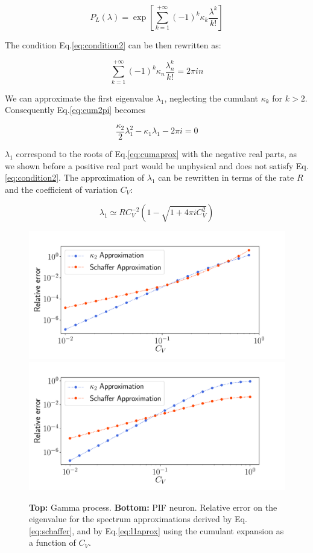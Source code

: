 \documentclass[12pt,twoside]{report}
\begin{document}
\begin{equation}
\label{eq:PLcum}
P_L(\lambda)=\exp\left[ \sum_{k=1}^{+\infty}(-1)^k\kappa_k \frac{\lambda^k}{k!}\right]
\end{equation}

The condition Eq.\eqref{eq:condition2} can be then rewritten as:

\begin{equation}
\label{eq:cum2pi}
\sum_{k=1}^{+\infty}(-1)^k\kappa_n \frac{\lambda_n^k}{k!}=2 \pi i n
\end{equation}

We can approximate the first eigenvalue $\lambda_1$, neglecting the cumulant $\kappa_k$ for $k>2$. Consequently  Eq.\eqref{eq:cum2pi} becomes

\begin{equation}
\label{eq:cumaprox}
\frac{\kappa_2}{2}\lambda_1^2-\kappa_1\lambda_1 -2\pi i=0
\end{equation}

$\lambda_1$ correspond to the roots of Eq.\eqref{eq:cumaprox} with the negative real parts, as we shown before a positive real part would be unphysical and does not satisfy Eq.\eqref{eq:condition2}. The approximation of $\lambda_1$ can be rewritten in terms of the rate $R$ and the coefficient of variation $C_V$: 

\begin{equation}
\label{eq:l1aprox}
\lambda_1\simeq RC_V^{-2}\left( 1-\sqrt{1+4\pi i C_V^2}\right)
\end{equation}

\begin{figure}[h!]
	\centering
	\includegraphics[width=0.8\linewidth]{kumulant_gamma.pdf}
	\centering
	\includegraphics[width=0.8\linewidth]{kumulant_pif.pdf}
	\caption{\textbf{Top:} Gamma process. \textbf{Bottom:} PIF neuron. Relative error on the eigenvalue for the spectrum approximations derived by \cite{SchOst13} Eq.\eqref{eq:schaffer}, and by Eq.\eqref{eq:l1aprox} using the cumulant expansion as a function of $C_V$.}
	\label{fig:kumulant}
\end{figure}
\end{document}
